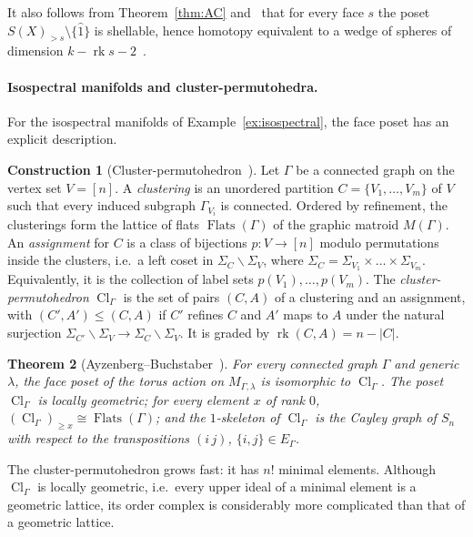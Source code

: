 \documentclass[11pt,a4paper]{article}
\numberwithin{equation}{section}
\theoremstyle{plain}
\newtheorem{theorem}{Theorem}[section]
\theoremstyle{definition}
\newtheorem{construction}[theorem]{Construction}
\theoremstyle{remark}
\DeclareMathOperator{\rk}{rk}
\DeclareMathOperator{\Flats}{Flats}
\DeclareMathOperator{\Cl}{Cl}
\begin{document}
It also follows from Theorem~\ref{thm:AC} and~\cite{Bjo92} that for every face $s$ the poset $S(X)_{>s}\setminus\{\hat1\}$ is shellable, hence homotopy equivalent to a wedge of spheres of dimension $k-\rk s-2$~\cite{AC22}.

\paragraph{Isospectral manifolds and cluster-permutohedra.}
For the isospectral manifolds of Example~\ref{ex:isospectral}, the face poset has an explicit description.

\begin{construction}[Cluster-permutohedron~{\cite[Constr.~2.13, Def.~2.14]{AB24}}]\label{con:cluster}
Let $\Gamma$ be a connected graph on the vertex set $V=[n]$. A \emph{clustering} is an unordered partition $C=\{V_1,\dots,V_m\}$ of $V$ such that every induced subgraph $\Gamma_{V_i}$ is connected. Ordered by refinement, the clusterings form the lattice of flats $\Flats(\Gamma)$ of the graphic matroid $M(\Gamma)$. An \emph{assignment} for $C$ is a class of bijections $p\colon V\to[n]$ modulo permutations inside the clusters, i.e.\ a left coset in $\Sigma_C\backslash\Sigma_V$, where $\Sigma_C=\Sigma_{V_1}\times\dots\times\Sigma_{V_m}$. Equivalently, it is the collection of label sets $p(V_1),\dots,p(V_m)$. The \emph{cluster-permutohedron} $\Cl_\Gamma$ is the set of pairs $(C,A)$ of a clustering and an assignment, with $(C',A')\leqslant(C,A)$ if $C'$ refines $C$ and $A'$ maps to $A$ under the natural surjection $\Sigma_{C'}\backslash\Sigma_V\to\Sigma_C\backslash\Sigma_V$. It is graded by $\rk(C,A)=n-|C|$.
\end{construction}

\begin{theorem}[Ayzenberg--Buchstaber~{\cite[Thm.~1]{AB24}}]\label{thm:AB}
For every connected graph $\Gamma$ and generic $\lambda$, the face poset of the torus action on $M_{\Gamma,\lambda}$ is isomorphic to $\Cl_\Gamma$. The poset $\Cl_\Gamma$ is locally geometric; for every element $x$ of rank $0$, $(\Cl_\Gamma)_{\geqslant x}\cong\Flats(\Gamma)$; and the $1$-skeleton of $\Cl_\Gamma$ is the Cayley graph of $S_n$ with respect to the transpositions $(i\,j)$, $\{i,j\}\in E_\Gamma$.
\end{theorem}

The cluster-permutohedron grows fast: it has $n!$ minimal elements. Although $\Cl_\Gamma$ is locally geometric, i.e.\ every upper ideal of a minimal element is a geometric lattice, its order complex is considerably more complicated than that of a geometric lattice.
\end{document}
